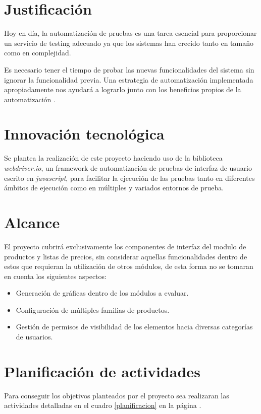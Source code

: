 \section{Justificación}
Hoy en día, la automatización de pruebas es una tarea esencial para proporcionar
un servicio de testing adecuado ya que los sistemas han crecido tanto en tamaño
como en complejidad.

Es necesario tener el tiempo de probar las nuevas funcionalidades del sistema
sin ignorar la funcionalidad previa. Una estrategia de automatización
implementada apropiadamente nos ayudará a lograrlo junto con los beneficios
propios de la automatización \cite{Software}.

\section{Innovación tecnológica}
Se plantea la realización de este proyecto haciendo uso de la biblioteca
\emph{webdriver.io}, un framework de automatización de pruebas de interfaz de
usuario escrito en \emph{javascript}, para facilitar la ejecución de las
pruebas tanto en diferentes ámbitos de ejecución como en múltiples y variados
entornos de prueba.

\section{Alcance}
El proyecto cubrirá exclusivamente los componentes de interfaz del modulo de
productos y listas de precios, sin considerar aquellas funcionalidades dentro de
estos que requieran la utilización de otros módulos, de esta forma no se tomaran
en cuenta los siguientes aspectos:

\begin{itemize}
\item Generación de gráficas dentro de los módulos a evaluar.
\item Configuración de múltiples familias de productos.
\item Gestión de permisos de visibilidad de los elementos hacia diversas
    categorías de usuarios.
\end{itemize}

\section{Planificación de actividades}
Para conseguir los objetivos planteados por el proyecto sea realizaran las
actividades detalladas en el cuadro \ref{planificacion} en la página
\pageref{planificacion}.

